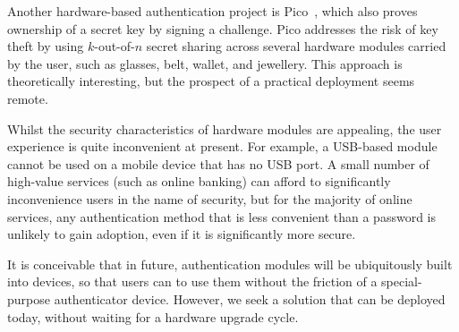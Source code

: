 Another hardware-based authentication project is Pico~\cite{Stajano11}, which also proves ownership
of a secret key by signing a challenge. Pico addresses the risk of key theft by using $k$-out-of-$n$
secret sharing across several hardware modules carried by the user, such as glasses, belt, wallet,
and jewellery. This approach is theoretically interesting, but the prospect of a practical
deployment seems remote.

Whilst the security characteristics of hardware modules are appealing, the user experience is quite
inconvenient at present. For example, a USB-based module cannot be used on a mobile device that has
no USB port. A small number of high-value services (such as online banking) can afford to
significantly inconvenience users in the name of security, but for the majority of online services,
any authentication method that is less convenient than a password is unlikely to gain adoption, even
if it is significantly more secure.

It is conceivable that in future, authentication modules will be ubiquitously built into devices, so
that users can to use them without the friction of a special-purpose authenticator device. However,
we seek a solution that can be deployed today, without waiting for a hardware upgrade cycle.

